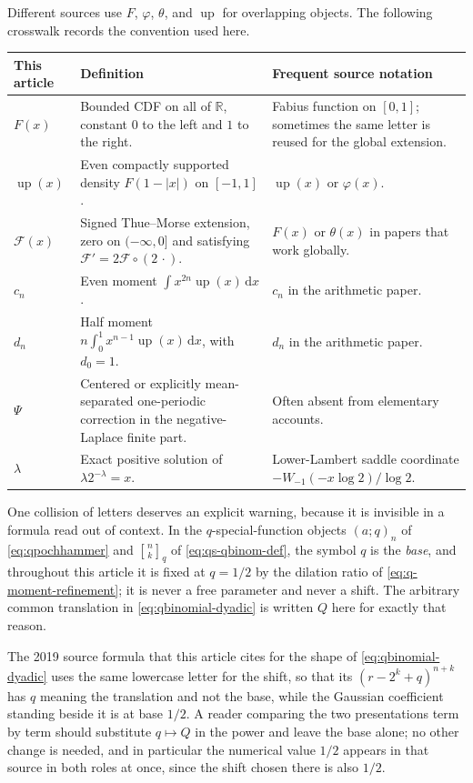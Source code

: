 \documentclass[11pt,oneside]{article}
\theoremstyle{definition}
\theoremstyle{remark}
\newcommand{\R}{\mathbb R}
\newcommand{\Up}{\operatorname{up}}
\newcommand{\dd}{\,\mathrm d}
\newcommand{\qbinom}[3]{\genfrac{[}{]}{0pt}{}{#1}{#2}_{#3}}
\begin{document}
Different sources use $F$, $\varphi$, $\theta$, and $\operatorname{up}$ for overlapping
objects.  The following crosswalk records the convention used here.

\begin{center}
\begin{tabularx}{0.95\textwidth}{@{}l>{\raggedright\arraybackslash}X>{\raggedright\arraybackslash}X@{}}
\toprule
This article & Definition & Frequent source notation\\
\midrule
$F(x)$ &
Bounded CDF on all of $\R$, constant $0$ to the left and $1$ to the right. &
Fabius function on $[0,1]$; sometimes the same letter is reused for the global extension.\\
$\Up(x)$ &
Even compactly supported density $F(1-|x|)$ on $[-1,1]$. &
$\operatorname{up}(x)$ or $\varphi(x)$.\\
$\mathcal F(x)$ &
Signed Thue--Morse extension, zero on $(-\infty,0]$ and satisfying
$\mathcal F'=2\mathcal F\circ(2\,\cdot)$. &
$F(x)$ or $\theta(x)$ in papers that work globally.\\
$c_n$ &
Even moment $\int x^{2n}\Up(x)\dd x$. &
$c_n$ in the arithmetic paper.\\
$d_n$ &
Half moment $n\int_0^1x^{n-1}\Up(x)\dd x$, with $d_0=1$. &
$d_n$ in the arithmetic paper.\\
$\Psi$ &
Centered or explicitly mean-separated one-periodic correction in the negative-Laplace
finite part. &
Often absent from elementary accounts.\\
$\lambda$ &
Exact positive solution of $\lambda2^{-\lambda}=x$. &
Lower-Lambert saddle coordinate
$-W_{-1}(-x\log2)/\log2$.\\
\bottomrule
\end{tabularx}
\end{center}

One collision of letters deserves an explicit warning, because it is invisible in a formula
read out of context.  In the $q$-special-function objects $(a;q)_n$ of
\eqref{eq:qpochhammer} and $\qbinom nkq$ of \eqref{eq:qs-qbinom-def}, the symbol $q$ is the
\emph{base}, and throughout this article it is fixed at $q=1/2$ by the dilation ratio of
\eqref{eq:q-moment-refinement}; it is never a free parameter and never a shift.  The
arbitrary common translation in \eqref{eq:qbinomial-dyadic} is written $Q$ here for exactly
that reason.

The 2019 source formula \cite{reshetnikovMSE} that this article cites for the shape of
\eqref{eq:qbinomial-dyadic} uses the same lowercase letter for the shift, so that its
$(r-2^k+q)^{n+k}$ has $q$ meaning the translation and not the base, while the Gaussian
coefficient standing beside it is at base $1/2$.  A reader comparing the two presentations
term by term should substitute $q\mapsto Q$ in the power and leave the base alone; no other
change is needed, and in particular the numerical value $1/2$ appears in that source in both
roles at once, since the shift chosen there is also $1/2$.
\end{document}
